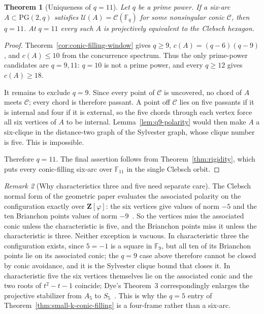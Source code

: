 \documentclass[11pt]{article}
\newtheorem{theorem}{Theorem}[section]
\theoremstyle{remark}
\newtheorem{remark}[theorem]{Remark}
\newcommand{\PG}{\mathrm{PG}}
\newcommand{\F}{\mathbb{F}}
\newcommand{\cC}{\mathcal{C}}
\newcommand{\cU}{\mathcal{U}}
\begin{document}
\begin{theorem}[Uniqueness of $q=11$]
\label{thm:why11}
Let $q$ be a prime power. If a six-arc $A\subset\PG(2,q)$ satisfies
$\cU(A)=\cC(\F_q)$ for some nonsingular conic $\cC$, then $q=11$.
At $q=11$ every such $A$ is projectively equivalent to the
Clebsch hexagon.
\end{theorem}

\begin{proof}
Theorem~\ref{cor:conic-filling-window} gives $q\ge9$,
$c(A)=(q-6)(q-9)$, and $c(A)\le10$ from the concurrence spectrum. Thus the only prime-power
candidates are $q=9,11$: $q=10$ is not a prime power, and every
$q\ge12$ gives $c(A)\ge18$.

It remains to exclude $q=9$. Since every point of $\cC$ is uncovered, no
chord of $A$ meets $\cC$; every chord is therefore passant. A point off
$\cC$ lies on five passants if it is internal and four if it is external,
so the five chords through each vertex force all six vertices of $A$ to be
internal. Lemma~\ref{lem:q9-polarity} would then make $A$ a
six-clique in the distance-two graph of the Sylvester graph, whose clique
number is five. This is impossible.

Therefore $q=11$. The final assertion follows from
Theorem~\ref{thm:rigidity}, which puts every conic-filling six-arc over
$\F_{11}$ in the single Clebsch orbit.
\end{proof}

\begin{remark}[Why characteristics three and five need separate care]
\label{rem:char-three-five}
The Clebsch normal form of the geometric paper evaluates the associated
polarity on the configuration exactly over $\mathbf Z[\varphi]$: the six
vertices give values of norm $-5$ and the ten Brianchon points values of
norm $-9$~\cite{RuddRigidity2026}.  So the vertices miss the associated
conic unless the characteristic is five, and the Brianchon points miss it
unless the characteristic is three.  Neither exception is vacuous.  In
characteristic three the configuration exists, since $5=-1$ is a square in
$\F_9$, but all ten of its Brianchon points lie on its associated conic;
the $q=9$ case above therefore cannot be closed by conic avoidance, and it
is the Sylvester clique bound that closes it.  In characteristic five the
six vertices themselves lie on the associated conic and the two roots of
$t^2-t-1$ coincide; Dye's Theorem~3 correspondingly enlarges the projective
stabilizer from $A_5$ to $S_5$~\cite[p.~278]{Dye1991}. This is why the $q=5$ entry of
Theorem~\ref{thm:small-k-conic-filling} is a four-frame rather than a
six-arc.
\end{remark}
\end{document}
